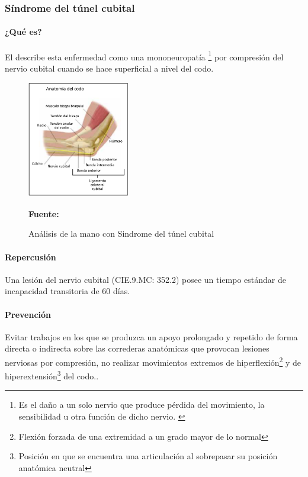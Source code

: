 \subsubsection{Síndrome del túnel cubital}
\paragraph{¿Qué es?}
El \parencite[1]{INSHT2017SindromeCodo} describe esta enfermedad como una mononeuropatía \footnote{Es el daño a un solo nervio que produce pérdida del movimiento, la sensibilidad u otra función de dicho nervio. \parencite{MedlinePlus2018Mononeuropatia}} por compresión del nervio cubital cuando se hace superficial a nivel del codo.
\begin{figure}[H]
    \centering
    \includegraphics[width=0.4\textwidth]{Anexos/LATEX/chapters/images/AnaCodo.png}
    \caption{Análisis de la mano con Sindrome del túnel cubital}
    \small{\textbf{Fuente:} \parencite[1]{INSHT2017SindromeCodo}}
    \label{AnaCodo}
\end{figure}
\paragraph{Repercusión}
Una lesión del nervio cubital (CIE.9.MC: 352.2) posee un tiempo estándar de incapacidad transitoria de 60 días\parencite[6]{INSHT2017SindromeCodo}.
\paragraph{Prevención}
Evitar trabajos en los que se produzca un apoyo prolongado y repetido de forma directa o indirecta sobre las correderas anatómicas que provocan lesiones nerviosas por compresión, no realizar movimientos extremos de hiperflexión\footnote{Flexión forzada de una extremidad a un grado mayor de lo normal} y de hiperextensión\footnote{Posición en que se encuentra una articulación al sobrepasar su posición anatómica neutral} del codo.\parencite[5]{INSHT2017SindromeCodo}.


